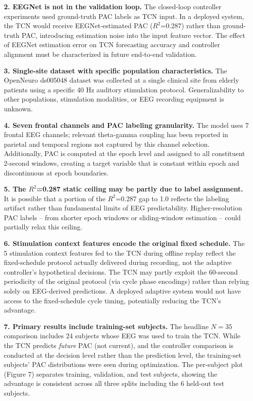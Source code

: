 \documentclass[11pt,letterpaper]{article}
\begin{document}
\textbf{2. EEGNet is not in the validation loop.} The closed-loop controller experiments used ground-truth PAC labels as TCN input. In a deployed system, the TCN would receive EEGNet-estimated PAC ($R^2$=0.287) rather than ground-truth PAC, introducing estimation noise into the input feature vector. The effect of EEGNet estimation error on TCN forecasting accuracy and controller alignment must be characterized in future end-to-end validation.

\textbf{3. Single-site dataset with specific population characteristics.} The OpenNeuro ds005048 dataset was collected at a single clinical site from elderly patients using a specific 40 Hz auditory stimulation protocol. Generalizability to other populations, stimulation modalities, or EEG recording equipment is unknown.

\textbf{4. Seven frontal channels and PAC labeling granularity.} The model uses 7 frontal EEG channels; relevant theta-gamma coupling has been reported in parietal and temporal regions not captured by this channel selection. Additionally, PAC is computed at the epoch level and assigned to all constituent 2-second windows, creating a target variable that is constant within epoch and discontinuous at epoch boundaries.

\textbf{5. The $R^2$=0.287 static ceiling may be partly due to label assignment.} It is possible that a portion of the $R^2$=0.287 gap to 1.0 reflects the labeling artifact rather than fundamental limits of EEG predictability. Higher-resolution PAC labels -- from shorter epoch windows or sliding-window estimation -- could partially relax this ceiling.

\textbf{6. Stimulation context features encode the original fixed schedule.} The 5 stimulation context features fed to the TCN during offline replay reflect the fixed-schedule protocol actually delivered during recording, not the adaptive controller's hypothetical decisions. The TCN may partly exploit the 60-second periodicity of the original protocol (via cycle phase encodings) rather than relying solely on EEG-derived predictions. A deployed adaptive system would not have access to the fixed-schedule cycle timing, potentially reducing the TCN's advantage.

\textbf{7. Primary results include training-set subjects.} The headline $N = 35$ comparison includes 24 subjects whose EEG was used to train the TCN. While the TCN predicts \textit{future} PAC (not current), and the controller comparison is conducted at the decision level rather than the prediction level, the training-set subjects' PAC distributions were seen during optimization. The per-subject plot (Figure 7) separates training, validation, and test subjects, showing the advantage is consistent across all three splits including the 6 held-out test subjects.
\end{document}
